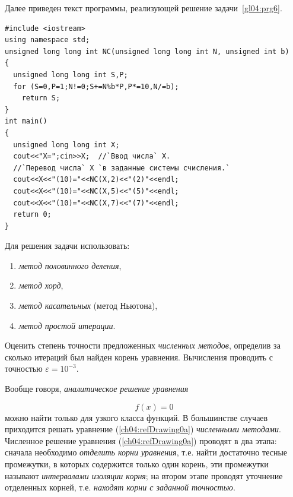 
Далее приведен текст программы, реализующей решение задачи~\ref{gl04:prg6}.

\begin{lstlisting}
#include <iostream>
using namespace std;
unsigned long long int NC(unsigned long long int N, unsigned int b)
{
  unsigned long long int S,P;
  for (S=0,P=1;N!=0;S+=N%b*P,P*=10,N/=b);
    return S;
}
int main()
{
  unsigned long long int X;
  cout<<"X=";cin>>X;  //`Ввод числа` X.
  //`Перевод числа` X `в заданные системы счисления.`
  cout<<X<<"(10)="<<NC(X,2)<<"(2)"<<endl;
  cout<<X<<"(10)="<<NC(X,5)<<"(5)"<<endl;
  cout<<X<<"(10)="<<NC(X,7)<<"(7)"<<endl;
  return 0;
}
\end{lstlisting}


Для
решения задачи использовать:
\begin{enumerate}
\item \emph{метод половинного деления},
\item \emph{метод хорд},
\item \emph{метод касательных} (метод Ньютона),
\item \emph{метод простой итерации}.
\end{enumerate}
Оценить степень точности предложенных \emph{численных методов}, определив за сколько итераций был найден
корень уравнения. Вычисления проводить с точностью  $\varepsilon=10^{-3}$.

Вообще говоря, \emph{аналитическое решение уравнения}

\begin{equation}\label{ch04:refDrawing0a}
f(x)=0
\end{equation}
можно найти только для узкого класса функций. В большинстве случаев приходится решать уравнение (\ref{ch04:refDrawing0a})
\emph{численными методами}. Численное решение уравнения (\ref{ch04:refDrawing0a}) проводят в два этапа: сначала
необходимо \emph{отделить корни уравнения}, т.е. найти достаточно тесные промежутки, в которых содержится
только один корень, эти промежутки называют \emph{интервалами изоляции корня}; на втором этапе проводят
уточнение отделенных корней, т.е. \emph{находят корни с заданной точностью}.

